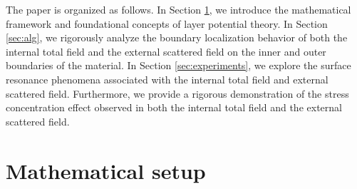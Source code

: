 \documentclass[11pt,reqno,twoside]{amsart}
\theoremstyle{definition}
\theoremstyle{remark}
\numberwithin{equation}{section}
\begin{document}

The paper is organized as follows. In Section \ref{sec:setup}, we introduce the mathematical framework and foundational concepts of layer potential theory. In Section \ref{sec:alg}, we rigorously analyze the boundary localization behavior of both the internal total field and the external scattered field on the inner and outer boundaries of the material. In Section \ref{sec:experiments}, we explore the surface resonance phenomena associated with the internal total field and external scattered field. Furthermore, we provide a rigorous demonstration of the stress concentration effect observed in both the internal total field and the external scattered field.

\section{Mathematical setup}
\label{sec:setup}
\end{document}
